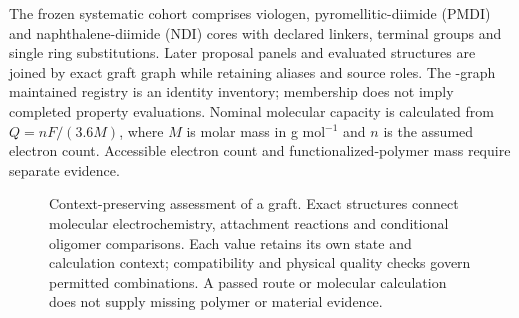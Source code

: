 \documentclass[11pt]{article}
\begin{document}
The frozen systematic cohort comprises viologen, pyromellitic-diimide (PMDI) and naphthalene-diimide (NDI) cores with declared linkers, terminal groups and single ring substitutions. Later proposal panels and evaluated structures are joined by exact graft graph while retaining aliases and source roles. The \UnifiedRegistryCount{}-graph maintained registry is an identity inventory; membership does not imply completed property evaluations. Nominal molecular capacity is calculated from $Q=nF/(3.6M)$, where $M$ is molar mass in g mol$^{-1}$ and $n$ is the assumed electron count. Accessible electron count and functionalized-polymer mass require separate evidence.

\begin{figure}[htbp]
\centering
{}
\caption{Context-preserving assessment of a graft. Exact structures connect molecular electrochemistry, attachment reactions and conditional oligomer comparisons. Each value retains its own state and calculation context; compatibility and physical quality checks govern permitted combinations. A passed route or molecular calculation does not supply missing polymer or material evidence.}
\label{fig:workflow}
\end{figure}
\end{document}
